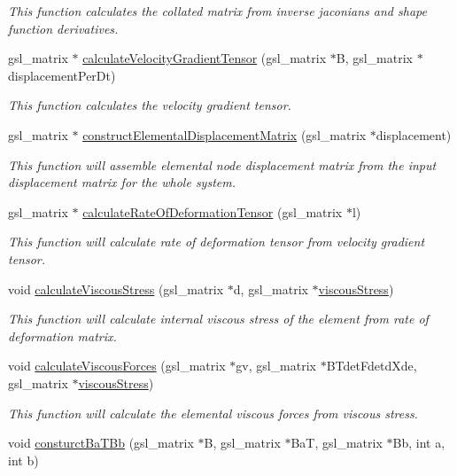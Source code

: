 \begin{DoxyCompactItemize}
\begin{DoxyCompactList}\small\item\em This function calculates the collated matrix from inverse jaconians and shape function derivatives. \end{DoxyCompactList}\item 
gsl\+\_\+matrix $\ast$ \hyperlink{classShapeBase_aafb0d14adc7ac116191bcff4a7837e98}{calculate\+Velocity\+Gradient\+Tensor} (gsl\+\_\+matrix $\ast$B, gsl\+\_\+matrix $\ast$displacement\+Per\+Dt)
\begin{DoxyCompactList}\small\item\em This function calculates the velocity gradient tensor. \end{DoxyCompactList}\item 
gsl\+\_\+matrix $\ast$ \hyperlink{classShapeBase_afcdbbe37a746ade52a1af70a9aa12b9f}{construct\+Elemental\+Displacement\+Matrix} (gsl\+\_\+matrix $\ast$displacement)
\begin{DoxyCompactList}\small\item\em This function will assemble elemental node displacement matrix from the input displacement matrix for the whole system. \end{DoxyCompactList}\item 
gsl\+\_\+matrix $\ast$ \hyperlink{classShapeBase_afbbf191777e8787a0e8307d30ce0aa9d}{calculate\+Rate\+Of\+Deformation\+Tensor} (gsl\+\_\+matrix $\ast$l)
\begin{DoxyCompactList}\small\item\em This function will calculate rate of deformation tensor from velocity gradient tensor. \end{DoxyCompactList}\item 
void \hyperlink{classShapeBase_a22ffae25fafb0fa584a3a4d0196af7aa}{calculate\+Viscous\+Stress} (gsl\+\_\+matrix $\ast$d, gsl\+\_\+matrix $\ast$\hyperlink{classShapeBase_a29f180dc41c5b6e12b9468dd557bb524}{viscous\+Stress})
\begin{DoxyCompactList}\small\item\em This function will calculate internal viscous stress of the element from rate of deformation matrix. \end{DoxyCompactList}\item 
void \hyperlink{classShapeBase_a4d10225f251fa1bd8a2e6ffc8feb5326}{calculate\+Viscous\+Forces} (gsl\+\_\+matrix $\ast$gv, gsl\+\_\+matrix $\ast$B\+Tdet\+Fdetd\+Xde, gsl\+\_\+matrix $\ast$\hyperlink{classShapeBase_a29f180dc41c5b6e12b9468dd557bb524}{viscous\+Stress})
\begin{DoxyCompactList}\small\item\em This function will calculate the elemental viscous forces from viscous stress. \end{DoxyCompactList}\item 
\hypertarget{classShapeBase_a7ae9fb15fa6e3f99173841ea910710c1}{}void \hyperlink{classShapeBase_a7ae9fb15fa6e3f99173841ea910710c1}{consturct\+Ba\+T\+Bb} (gsl\+\_\+matrix $\ast$B, gsl\+\_\+matrix $\ast$Ba\+T, gsl\+\_\+matrix $\ast$Bb, int a, int b)\label{classShapeBase_a7ae9fb15fa6e3f99173841ea910710c1}


\end{DoxyCompactItemize}
